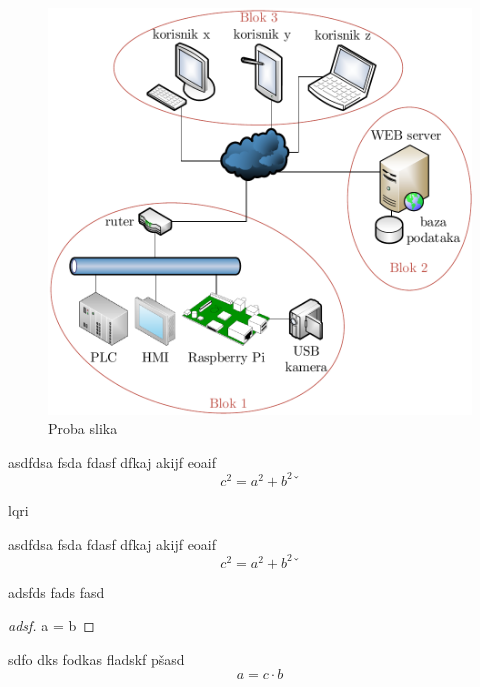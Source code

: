 \documentclass[skripta, fancy]{FSBtex}
\begin{document}
\begin{figure}[h!]
\centering
\includegraphics[scale=.5]{IoT_ideja.pdf}
\caption{Proba slika}
\end{figure}

\lipsum[1-1]

\begin{theorem}[Proba]
asdfdsa fsda fdasf dfkaj akijf eoaif
\begin{equation}
c^2 = a^2+b^2ˇ
\end{equation}
\end{theorem}

\lipsum[1-2]
\acrlong{lqri}
\begin{definition}[Proba]
asdfdsa fsda fdasf dfkaj akijf eoaif
\begin{equation}
c^2 = a^2+b^2ˇ
\end{equation}
\end{definition}

\begin{remark}
adsfds fads fasd 
\end{remark}

\lipsum[1-2]


\begin{proof}[adsf]
a = b
\end{proof}

\begin{exercise}
sdfo dks fodkas fladskf pšasd
\begin{equation}
a = c\cdot b
\end{equation}
\end{exercise}
\end{document}
